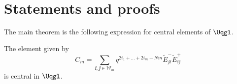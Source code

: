 \section{Statements and proofs}

The main theorem is the following expression for central elements of $\Uqgl$.
\begin{Theorem}\label{Main}
	The element given by
\begin{equation*}
C_m=\sum_{\ii,\jj \in \mathcal{W}_m} q^{ 2i_1 + \dots + 2i_m-Nm} \tilde{E}_{\jj \ii}^-\tilde{E}_{\ii\jj}^+
\end{equation*}
is central in $ \Uqgl $.
\end{Theorem}
